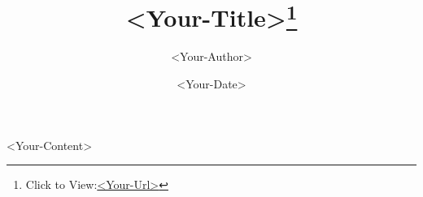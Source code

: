 \documentclass{article}
\title{<Your-Title>\footnote{Click to View:\url{<Your-Url>}}}
\author{<Your-Author>}
\date{<Your-Date>}
\begin{document}

\setlength\parindent{0pt}

\Large

<Your-Content>
\end{document}
